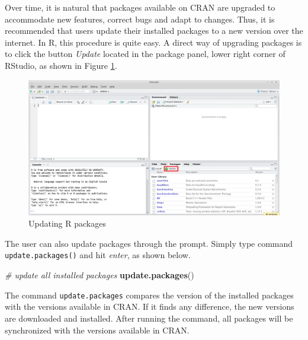 \documentclass[
  12pt,
]{book}
\newenvironment{Shaded}{\begin{snugshade}}{\end{snugshade}}
\newcommand{\CommentTok}[1]{\textcolor[rgb]{0.37,0.37,0.37}{\textit{#1}}}
\newcommand{\KeywordTok}[1]{\textcolor[rgb]{0.27,0.27,0.27}{\textbf{#1}}}
\newcommand{\NormalTok}[1]{#1}
\begin{document}
Over time, it is natural that packages available on CRAN are upgraded to accommodate new features, correct bugs and adapt to changes. Thus, it is recommended that users update their installed packages to a new version over the internet. In R, this procedure is quite easy. A direct way of upgrading packages is to click the button \emph{Update} located in the package panel, lower right corner of RStudio, as shown in Figure \ref{fig:RStudio-update}.

\begin{figure}[!htbp]

{\centering \includegraphics[width=1\linewidth]{figs/RStudio_update} 

}

\caption{Updating R packages}\label{fig:RStudio-update}
\end{figure}

The user can also update packages through the prompt. Simply type command \texttt{update.packages()} and hit \emph{enter}, as shown below. 

\begin{Shaded}
\begin{Highlighting}[]
\CommentTok{# update all installed packages}
\KeywordTok{update.packages}\NormalTok{()}
\end{Highlighting}
\end{Shaded}

The command \texttt{update.packages} compares the version of the installed packages with the versions available in CRAN. If it finds any difference, the new versions are downloaded and installed. After running the command, all packages will be synchronized with the versions available in CRAN.
\end{document}
